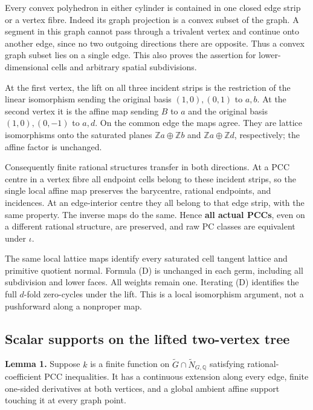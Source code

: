 \documentclass[
  11pt,
]{article}
\begin{document}
Every convex polyhedron in either cylinder is contained in one closed
edge strip or a vertex fibre. Indeed its graph projection is a convex
subset of the graph. A segment in this graph cannot pass through a
trivalent vertex and continue onto another edge, since no two outgoing
directions there are opposite. Thus a convex graph subset lies on a
single edge. This also proves the assertion for lower-dimensional cells
and arbitrary spatial subdivisions.

At the first vertex, the lift on all three incident strips is the
restriction of the linear isomorphism sending the original basis
\((1,0),(0,1)\) to \(a,b\). At the second vertex it is the affine map
sending \(B\) to \(a\) and the original basis \((1,0),(0,-1)\) to
\(a,d\). On the common edge the maps agree. They are lattice
isomorphisms onto the saturated planes \(\mathbb Za\oplus\mathbb Zb\)
and \(\mathbb Za\oplus\mathbb Zd\), respectively; the affine factor is
unchanged.

Consequently finite rational structures transfer in both directions. At
a PCC centre in a vertex fibre all endpoint cells belong to these
incident strips, so the single local affine map preserves the
barycentre, rational endpoints, and incidences. At an edge-interior
centre they all belong to that edge strip, with the same property. The
inverse maps do the same. Hence \textbf{all actual PCCs}, even on a
different rational structure, are preserved, and raw PC classes are
equivalent under \(\iota\).

The same local lattice maps identify every saturated cell tangent
lattice and primitive quotient normal. Formula (D) is unchanged in each
germ, including all subdivision and lower faces. All weights remain one.
Iterating (D) identifies the full \(d\)-fold zero-cycles under the lift.
This is a local isomorphism argument, not a pushforward along a
nonproper map.

\subsection{Scalar supports on the lifted two-vertex
tree}\label{scalar-supports-on-the-lifted-two-vertex-tree}

\textbf{Lemma 1.} Suppose \(k\) is a finite function on
\(\widetilde G\cap\widetilde N_{G,\mathbb Q}\) satisfying
rational-coefficient PCC inequalities. It has a continuous extension
along every edge, finite one-sided derivatives at both vertices, and a
global ambient affine support touching it at every graph point.
\end{document}
